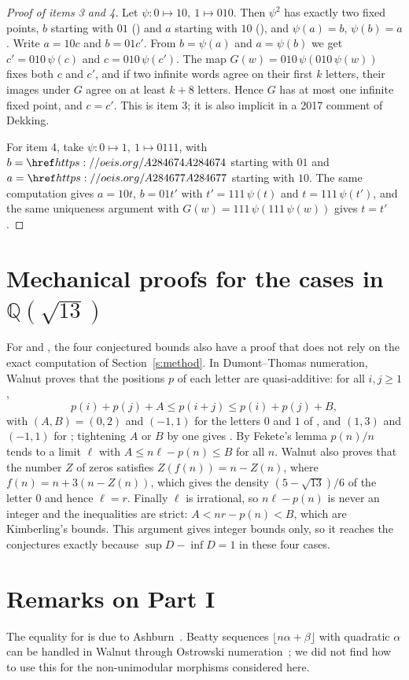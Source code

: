 \begin{proof}[Proof of items 3 and 4] Let $\psi: 0\mapsto10,\ 1\mapsto010$. Then $\psi^2$ has exactly two
fixed points, $b$ starting with $01$ () and $a$ starting with $10$ (), and
$\psi(a)=b$, $\psi(b)=a$. Write $a=10c$ and $b=01c'$. From $b=\psi(a)$ and $a=\psi(b)$ we get
$c'=010\,\psi(c)$ and $c=010\,\psi(c')$. The map $G(w)=010\,\psi(010\,\psi(w))$ fixes both $c$ and $c'$,
and if two infinite words agree on their first $k$ letters, their images under $G$ agree on at least $k+8$
letters. Hence $G$ has at most one infinite fixed point, and $c=c'$. This is item 3; it is also implicit in
a 2017 comment of Dekking.

For item 4, take $\psi: 0\mapsto1,\ 1\mapsto0111$, with $b=\oeis{A284674}$ starting with $01$ and
$a=\oeis{A284677}$ starting with $10$. The same computation gives $a=10t$, $b=01t'$ with $t'=111\,\psi(t)$ and
$t=111\,\psi(t')$, and the same uniqueness argument with $G(w)=111\,\psi(111\,\psi(w))$ gives $t=t'$.
\end{proof}

\section{Mechanical proofs for the cases in \texorpdfstring{$\mathbb{Q}(\sqrt{13})$}{Q(sqrt 13)}}
For  and , the four conjectured bounds also have a proof that does not rely on
the exact computation of Section~\ref{s:method}. In Dumont--Thomas numeration, Walnut proves that the
positions $p$ of each letter are quasi-additive: for all $i,j\ge1$,
\[ p(i)+p(j)+A\le p(i+j)\le p(i)+p(j)+B, \]
with $(A,B)=(0,2)$ and $(-1,1)$ for the letters $0$ and $1$ of , and $(1,3)$ and $(-1,1)$ for
; tightening $A$ or $B$ by one gives \FALSE. By Fekete's lemma $p(n)/n$ tends to a
limit $\ell$ with $A\le n\ell-p(n)\le B$ for all $n$. Walnut also proves that the number $Z$ of zeros
satisfies $Z(f(n))=n-Z(n)$, where $f(n)=n+3(n-Z(n))$, which gives the density $(5-\sqrt{13})/6$ of the
letter $0$ and hence $\ell=r$. Finally $\ell$ is irrational, so $n\ell-p(n)$ is never an integer and the
inequalities are strict: $A<nr-p(n)<B$, which are Kimberling's bounds. This argument gives integer bounds
only, so it reaches the conjectures exactly because $\sup D-\inf D=1$ in these four cases.

\section{Remarks on Part I}
The equality for  is due to Ashburn~\cite{As}. Beatty sequences
$\lfloor n\alpha+\beta\rfloor$ with quadratic $\alpha$ can be handled in Walnut through Ostrowski
numeration~\cite{SSZ}; we did not find how to use this for the non-unimodular morphisms considered here.

